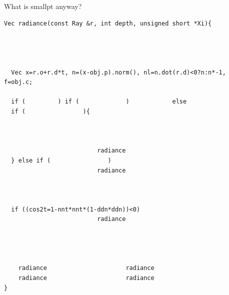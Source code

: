 \documentclass[8pt]{beamer}
\begin{document}
\begin{frame}[fragile]{What is smallpt anyway?}
\footnotesize
\begin{verbatim}
Vec radiance(const Ray &r, int depth, unsigned short *Xi){ 
                                                                      
                                                                      
                                                                   
                                                            
  Vec x=r.o+r.d*t, n=(x-obj.p).norm(), nl=n.dot(r.d)<0?n:n*-1, f=obj.c; 
                                                                         
  if (         ) if (             )            else 
  if (                ){                  
                                                                
                                                                  
                                                                   
                          radiance
  } else if (                )            
                          radiance
                                                                         
                                                                        
                                                                     
  if ((cos2t=1-nnt*nnt*(1-ddn*ddn))<0)
                          radiance
                                                                       
                                                                        
                                                                         
                                                                         
    radiance                      radiance
    radiance                      radiance
} 
\end{verbatim}
\end{frame}

\end{document}
